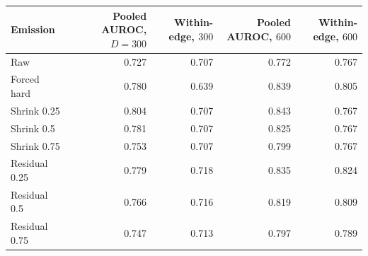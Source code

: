 \begin{tabular}{lrrrr}
\toprule
Emission & Pooled AUROC, $D=300$ & Within-edge, $300$ & Pooled AUROC, $600$ & Within-edge, $600$ \\
\midrule
Raw & 0.727 & 0.707 & 0.772 & 0.767 \\
Forced hard & 0.780 & 0.639 & 0.839 & 0.805 \\
Shrink 0.25 & 0.804 & 0.707 & 0.843 & 0.767 \\
Shrink 0.5 & 0.781 & 0.707 & 0.825 & 0.767 \\
Shrink 0.75 & 0.753 & 0.707 & 0.799 & 0.767 \\
Residual 0.25 & 0.779 & 0.718 & 0.835 & 0.824 \\
Residual 0.5 & 0.766 & 0.716 & 0.819 & 0.809 \\
Residual 0.75 & 0.747 & 0.713 & 0.797 & 0.789 \\
\bottomrule
\end{tabular}
